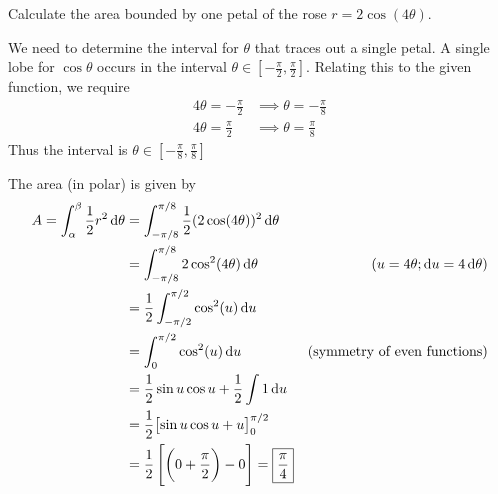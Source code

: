 \documentclass[12pt,answers]{exam}
\begin{document}
\begin{questions}

\newpage
\question[10]
Calculate the area bounded by one petal of the rose $r = 2\cos(4\theta)$.
\begin{solution}
    We need to determine the interval for $\theta$ that traces out a single petal. 
    A single lobe for $\cos \theta$ occurs in the interval $\theta \in [-\frac\pi2, \frac\pi2]$.
    Relating this to the given function, we require
    \begin{align*}
        4\theta = -\frac\pi2 &\implies \theta = -\frac\pi8 \\ 
        4\theta = \frac\pi2 &\implies \theta = \frac\pi8 
    \end{align*}
    Thus the interval is $\theta \in [-\frac\pi8, \frac\pi8]$

    The area (in polar) is given by
    \begin{align*}
        A = \int_\alpha^\beta \frac12 r^2 \dif \theta
        &= \int_{-\pi/8}^{\pi/8} \frac12 (2\cos(4\theta))^2 \dif \theta\\ 
        &= \int_{-\pi/8}^{\pi/8} 2 \cos^2(4\theta) \dif \theta & (u = 4\theta; \dif u = 4\dif \theta)\\
        &= \frac 12 \int_{-\pi/2}^{\pi/2} \cos^2(u) \dif u \\
        &= \int_{0}^{\pi/2} \cos^2(u) \dif u & (\text{symmetry of even functions})\\
        &= \frac12 \sin u \cos u + \frac 12 \int 1 \dif u \\ 
        &= \frac12 \bigl[\sin u \cos u + u \bigr]_0^{\pi/2} \\
        &= \frac12\left[ \left(0 + \frac\pi2 \right) - 0 \right]
        = \boxed{\frac \pi4}
    \end{align*}
\end{solution}
\end{questions}
\end{document}
